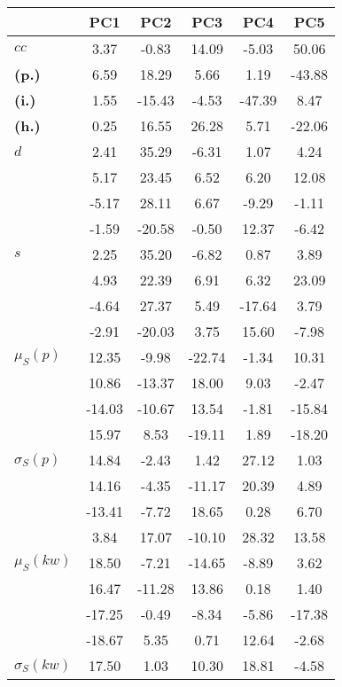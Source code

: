 \begin{table}[h!]
\begin{center}
\begin{tabular}{| l || c | c | c | c | c |}\hline
 & {\bf PC1} & {\bf PC2} & {\bf PC3} & {\bf PC4} & {\bf PC5} \\\hline\hline
{\bf $cc$} & 3.37 & -0.83 & 14.09 & -5.03 & 50.06 \\
{\bf (p.)} & 6.59 & 18.29 & 5.66 & 1.19 & -43.88 \\
{\bf (i.)} & 1.55 & -15.43 & -4.53 & -47.39 & 8.47 \\
{\bf (h.)} & 0.25 & 16.55 & 26.28 & 5.71 & -22.06 \\\hline
{\bf $d$} & 2.41 & 35.29 & -6.31 & 1.07 & 4.24 \\
{\bf } & 5.17 & 23.45 & 6.52 & 6.20 & 12.08 \\
{\bf } & -5.17 & 28.11 & 6.67 & -9.29 & -1.11 \\
{\bf } & -1.59 & -20.58 & -0.50 & 12.37 & -6.42 \\\hline
{\bf $s$} & 2.25 & 35.20 & -6.82 & 0.87 & 3.89 \\
{\bf } & 4.93 & 22.39 & 6.91 & 6.32 & 23.09 \\
 & -4.64  & 27.37  & 5.49  & -17.64  & 3.79 \\
 & -2.91  & -20.03  & 3.75  & 15.60  & -7.98 \\\hline
$\mu_S(p)$ & 12.35  & -9.98  & -22.74  & -1.34  & 10.31 \\
 & 10.86  & -13.37  & 18.00  & 9.03  & -2.47 \\
 & -14.03  & -10.67  & 13.54  & -1.81  & -15.84 \\
 & 15.97  & 8.53  & -19.11  & 1.89  & -18.20 \\\hline
$\sigma_S(p)$ & 14.84  & -2.43  & 1.42  & 27.12  & 1.03 \\
 & 14.16  & -4.35  & -11.17  & 20.39  & 4.89 \\
 & -13.41  & -7.72  & 18.65  & 0.28  & 6.70 \\
 & 3.84  & 17.07  & -10.10  & 28.32  & 13.58 \\\hline
$\mu_S(kw)$ & 18.50  & -7.21  & -14.65  & -8.89  & 3.62 \\
 & 16.47  & -11.28  & 13.86  & 0.18  & 1.40 \\
 & -17.25  & -0.49  & -8.34  & -5.86  & -17.38 \\
 & -18.67  & 5.35  & 0.71  & 12.64  & -2.68 \\\hline
$\sigma_S(kw)$ & 17.50  & 1.03  & 10.30  & 18.81  & -4.58 \\

\end{tabular}
\end{center}
\end{table}
